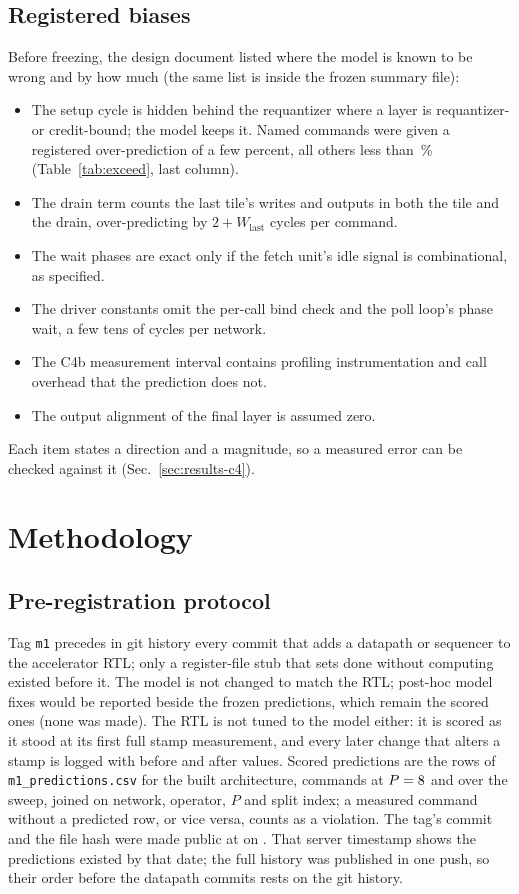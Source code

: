 \documentclass[journal]{IEEEtran}
\begin{document}
\subsection{Registered biases}\label{sec:biases}
Before freezing, the design document listed where the model is known to be wrong and by how much (the same list is inside the frozen summary file):
\begin{itemize}\setlength{\itemsep}{1pt}
\item The setup cycle is hidden behind the requantizer where a layer is requantizer- or credit-bound; the model keeps it. Named commands were given a registered over-prediction of a few percent, all others less than \BiasDefault\,\% (Table~\ref{tab:exceed}, last column).
\item The drain term counts the last tile's writes and outputs in both the tile and the drain, over-predicting by $2+W_{\mathrm{last}}$ cycles per command.
\item The wait phases are exact only if the fetch unit's idle signal is combinational, as specified.
\item The driver constants omit the per-call bind check and the poll loop's phase wait, a few tens of cycles per network.
\item The C4b measurement interval contains profiling instrumentation and call overhead that the prediction does not.
\item The output alignment of the final layer is assumed zero.
\end{itemize}
Each item states a direction and a magnitude, so a measured error can be checked against it (Sec.~\ref{sec:results-c4}).

\section{Methodology}\label{sec:method}
\subsection{Pre-registration protocol}
Tag \texttt{m1} precedes in git history every commit that adds a datapath or sequencer to the accelerator RTL; only a register-file stub that sets done without computing existed before it. The model is not changed to match the RTL; post-hoc model fixes would be reported beside the frozen predictions, which remain the scored ones (none was made). The RTL is not tuned to the model either: it is scored as it stood at its first full stamp measurement, and every later change that alters a stamp is logged with before and after values. Scored predictions are the rows of \texttt{m1\_predictions.csv} for the built architecture, \MOneRowsPeight{} commands at $P=8$ and \MOneRows{} over the sweep, joined on network, operator, $P$ and split index; a measured command without a predicted row, or vice versa, counts as a violation. The tag's commit and the file hash were made public at \PreregUrl{} on \PreregDate{}. That server timestamp shows the predictions existed by that date; the full history was published in one push, so their order before the datapath commits rests on the git history.
\end{document}

